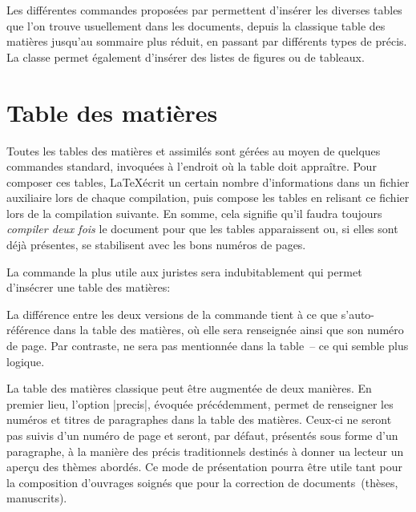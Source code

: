 Les différentes commandes proposées par \frenchlaw permettent d'insérer les diverses tables que l'on trouve usuellement dans les documents, depuis la classique table des matières jusqu'au sommaire plus réduit, en passant par différents types de précis. La classe permet également d'insérer des listes de figures ou de tableaux.

\section{Table des matières}

Toutes les tables des matières et assimilés sont gérées au moyen de quelques commandes standard, invoquées à l'endroit où la table doit appraître. Pour composer ces tables, \LaTeX écrit un certain nombre d'informations dans un fichier auxiliaire lors de chaque compilation, puis compose les tables en relisant ce fichier lors de la compilation suivante. En somme, cela signifie qu'il faudra toujours \emph{compiler deux fois} le document pour que les tables apparaissent ou, si elles sont déjà présentes, se stabilisent avec les bons numéros de pages.

La commande la plus utile aux juristes sera indubitablement  qui permet d'insécrer une table des matières:

\begin{macro}
	\tableofcontents %
	\tableofcontents* %
\end{macro}

La différence entre les deux versions de la commande tient à ce que  s'auto-référence dans la table des matières, où elle sera renseignée ainsi que son numéro de page. Par contraste,  ne sera pas mentionnée dans la table~-- ce qui semble plus logique.

La table des matières classique peut être augmentée de deux manières. En premier lieu, l'option |precis|, évoquée précédemment, permet de renseigner les numéros et titres de paragraphes dans la table des matières. Ceux-ci ne seront pas suivis d'un numéro de page et seront, par défaut, présentés sous forme d'un paragraphe, à la manière des précis traditionnels destinés à donner ua lecteur un aperçu des thèmes abordés. Ce mode de présentation pourra être utile tant pour la composition d'ouvrages soignés que pour la correction de documents~(thèses, manuscrits).

